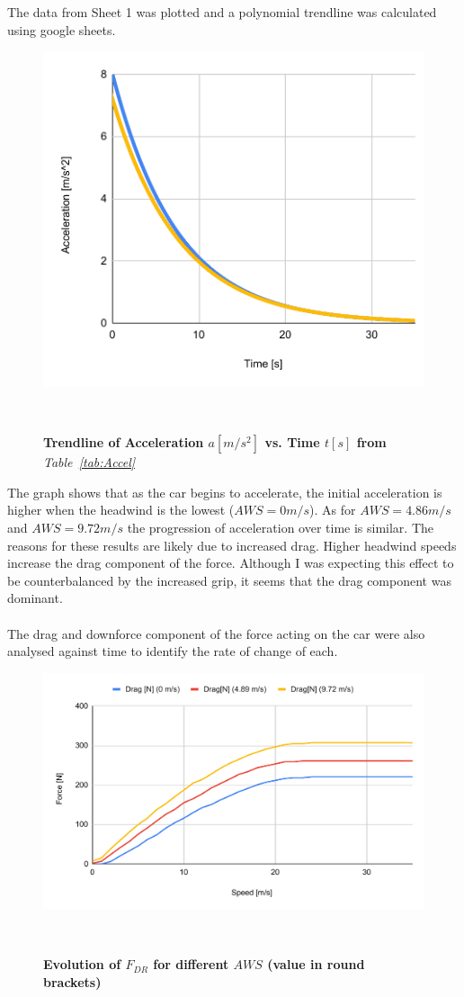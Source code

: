 \documentclass[11pt, a4paper]{article}
\begin{document}
The data from Sheet 1 was plotted and a polynomial trendline was calculated using google sheets.
\begin{figure}[H]
    \centering
    \caption{\textbf{Trendline of Acceleration $a [m/s^2]$ vs. Time $t [s]$ from }\textit{Table~\ref{tab:Accel}}}
    \includegraphics[width=\textwidth]{images/accel.pdf}
    
~\label{fig:accel}
\end{figure}
The graph shows that as the car begins to accelerate, the initial acceleration is higher when the headwind is the lowest ($AWS=0m/s$). As for $AWS=4.86m/s$ and $AWS=9.72m/s$ the progression of acceleration over time is similar.
The reasons for these results are likely due to increased drag. Higher headwind speeds increase the drag component of the force. Although I was expecting this effect to be counterbalanced by the increased grip, it seems that the drag component was dominant.
\\\\
The drag and downforce component of the force acting on the car were also analysed against time to identify the rate of change of each. 
\begin{figure}[H]
    \centering\caption{\textbf{Evolution of $F_{DR}$ for different $AWS$ (value in round brackets)}}
    \includegraphics[width=\textwidth]{images/drag_time.pdf}
    
~\label{fig:dr_time}
\end{figure}
\end{document}
